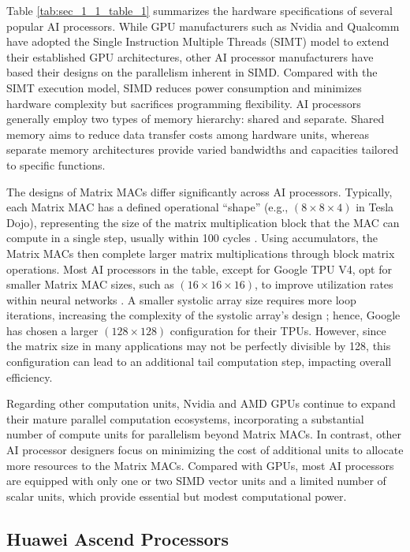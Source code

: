 Table \ref{tab:sec_1_1_table_1} summarizes the hardware specifications of several popular AI processors. While GPU manufacturers such as Nvidia and Qualcomm have adopted the Single Instruction Multiple Threads (SIMT) model to extend their established GPU architectures, other AI processor manufacturers have based their designs on the parallelism inherent in SIMD. Compared with the SIMT execution model, SIMD reduces power consumption and minimizes hardware complexity but sacrifices programming flexibility. AI processors generally employ two types of memory hierarchy: shared and separate. Shared memory aims to reduce data transfer costs among hardware units, whereas separate memory architectures provide varied bandwidths and capacities tailored to specific functions.

The designs of Matrix MACs differ significantly across AI processors. Typically, each Matrix MAC has a defined operational “shape” (e.g., $(8 \times 8 \times 4)$ in Tesla Dojo), representing the size of the matrix multiplication block that the MAC can compute in a single step, usually within 100 cycles \cite{Mi300}. Using accumulators, the Matrix MACs then complete larger matrix multiplications through block matrix operations. Most AI processors in the table, except for Google TPU V4, opt for smaller Matrix MAC sizes, such as $(16 \times 16 \times 16)$, to improve utilization rates within neural networks \cite{DBLP:conf/hotchips/LiaoTXZ19}. A smaller systolic array size requires more loop iterations, increasing the complexity of the systolic array's design \cite{DBLP:journals/csur/XuMGL24}; hence, Google has chosen a larger $(128 \times 128)$ configuration for their TPUs. However, since the matrix size in many applications may not be perfectly divisible by 128, this configuration can lead to an additional tail computation step, impacting overall efficiency.

Regarding other computation units, Nvidia and AMD GPUs continue to expand their mature parallel computation ecosystems, incorporating a substantial number of compute units for parallelism beyond Matrix MACs. In contrast, other AI processor designers focus on minimizing the cost of additional units to allocate more resources to the Matrix MACs. Compared with GPUs, most AI processors are equipped with only one or two SIMD vector units and a limited number of scalar units, which provide essential but modest computational power.

\subsection{Huawei Ascend Processors}
\label{Sec:1_1_2}

